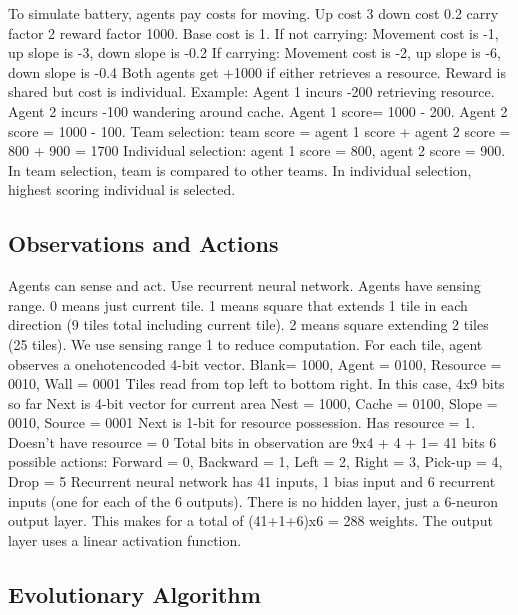 \documentclass[sigconf]{aamas}  %
\begin{document}
To simulate battery, agents pay costs for moving.
Up cost 3 down cost 0.2 carry factor 2 reward factor 1000. Base cost is 1.
If not carrying: Movement cost is -1, up slope is -3, down slope is -0.2
If carrying: Movement cost is -2, up slope is -6, down slope is -0.4
Both agents get +1000 if either retrieves a resource. Reward is shared but cost is individual.
Example: Agent 1 incurs -200 retrieving resource. Agent 2 incurs -100 wandering around cache. Agent 1 score= 1000 - 200. Agent 2 score = 1000 - 100.
Team selection: team score = agent 1 score + agent 2 score = 800 + 900 = 1700
Individual selection: agent 1 score = 800, agent 2 score = 900. 
In team selection, team is compared to other teams. In individual selection, highest scoring individual is selected. 

\subsection{Observations and Actions}

Agents can sense and act. Use recurrent neural network.
Agents have sensing range. 0 means just current tile. 1 means square that extends 1 tile in each direction (9 tiles total including current tile). 2 means square extending 2 tiles (25 tiles). We use sensing range 1 to reduce computation.
For each tile, agent observes a onehotencoded 4-bit vector. 
Blank= 1000, Agent = 0100, Resource = 0010, Wall = 0001
Tiles read from top left to bottom right. In this case, 4x9 bits so far
Next is 4-bit vector for current area
Nest = 1000, Cache = 0100, Slope = 0010, Source = 0001
Next is 1-bit for resource possession. Has resource = 1. Doesn’t have resource = 0
Total bits in observation are 9x4 + 4 + 1= 41 bits
6 possible actions:
Forward = 0, Backward = 1, Left = 2, Right = 3, Pick-up = 4, Drop = 5
Recurrent neural network has 41 inputs, 1 bias input and 6 recurrent inputs (one for each of the 6 outputs). There is no hidden layer, just a 6-neuron output layer. This makes for a total of (41+1+6)x6 = 288 weights. The output layer uses a linear activation function.

\subsection{Evolutionary Algorithm}
\end{document}
